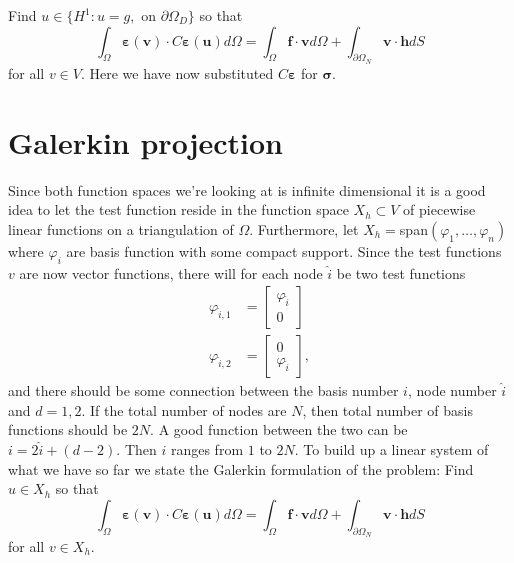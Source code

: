 \documentclass[paper=a4, fontsize=11pt]{scrartcl} %
\begin{document}
Find $u \in \{H^1 : u=g,$ on $\partial\Omega_D\}$ so that
\begin{equation}
\label{VarForm}
\int_{\Omega}\boldsymbol{\varepsilon}(\boldsymbol{v})\cdot C\boldsymbol{\varepsilon}(\boldsymbol{u})d\Omega = \int_{\Omega}\boldsymbol{f}\cdot \boldsymbol{v} d\Omega + \int_{\partial \Omega_N}\boldsymbol{v}\cdot\boldsymbol{h}dS
\end{equation}
for all $v\in V$. Here we have now substituted $C\boldsymbol{\varepsilon}$ for $\boldsymbol{\sigma}$.

\section*{Galerkin projection}
Since both function spaces we're looking at is infinite dimensional it is a good idea to let the test function reside in the function space $X_h \subset V$ of piecewise linear functions on a triangulation of $\Omega$. Furthermore, let $X_h =$span$(\varphi_1,\ldots,\varphi_n)$ where $\varphi_i$ are basis function with some compact support. Since the test functions $v$ are now vector functions, there will for each node $\hat{i}$ be two test functions
\begin{align*}
\varphi_{\hat{i},1} &= \begin{bmatrix}
\varphi_{\hat{i}} \\ 0
\end{bmatrix} \\
\varphi_{\hat{i},2} &= \begin{bmatrix}
0 \\ \varphi_{\hat{i}}
\end{bmatrix},
\end{align*}
and there should be some connection between the basis number $i$, node number $\hat{i}$ and $d=1,2$. If the total number of nodes are $N$, then total number of basis functions should be $2N$. A good function between the two can be $i = 2\hat{i}+ (d-2)$. Then $i$ ranges from $1$ to $2N$. To build up a linear system of what we have so far we state the Galerkin formulation of the problem: Find $u \in X_h$ so that
\begin{equation}
\label{Galerkin}
\int_{\Omega}\boldsymbol{\varepsilon}(\boldsymbol{v})\cdot C\boldsymbol{\varepsilon}(\boldsymbol{u})d\Omega = \int_{\Omega}\boldsymbol{f}\cdot \boldsymbol{v} d\Omega + \int_{\partial \Omega_N}\boldsymbol{v}\cdot\boldsymbol{h}dS
\end{equation}
for all $v\in X_h$.
\end{document}

